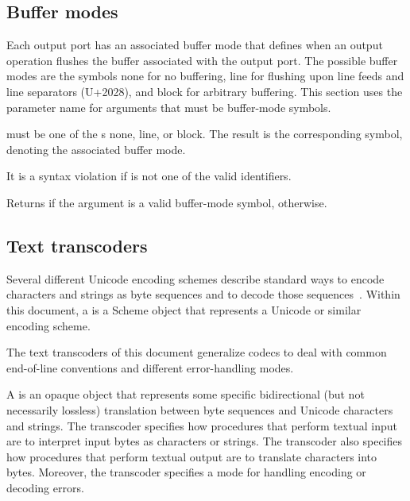 \subsection{Buffer modes}

Each output port has an associated buffer mode that defines when an
output operation flushes the buffer associated with the output
port. The possible buffer modes are the symbols {\cf none} for no buffering,
{\cf line} for flushing upon line feeds and line separators (U+2028), and
{\cf block} for arbitrary buffering.  This section uses the parameter name
 for arguments that must be buffer-mode symbols.

\begin{entry}{%
}
   
 must be one of the s {\cf none}, {\cf line}, or
{\cf block}. The result is the corresponding symbol, denoting the
associated buffer mode.

It is a syntax violation if  is not one of the valid
identifiers.
\end{entry}

\begin{entry}{%
}
   
Returns \schtrue{} if the argument is a valid buffer-mode symbol,
\schfalse{} otherwise.
\end{entry}

\subsection{Text transcoders}

Several different Unicode encoding schemes describe standard ways to
encode characters and strings as byte sequences and to decode those
sequences~\cite{Unicode}.  Within this document, a  is a Scheme object
that represents a Unicode or similar encoding scheme.

The text transcoders of this document generalize codecs
to deal with common end-of-line conventions and different
error-handling modes.

A  is an opaque object that represents
some specific bidirectional (but not necessarily lossless) translation
between byte sequences and Unicode characters and strings.  The
transcoder specifies how procedures that perform textual input are to
interpret input bytes as characters or strings.  The transcoder also
specifies how procedures that perform textual output are to translate
characters into bytes.  Moreover, the transcoder specifies a
mode for handling encoding or decoding errors.

